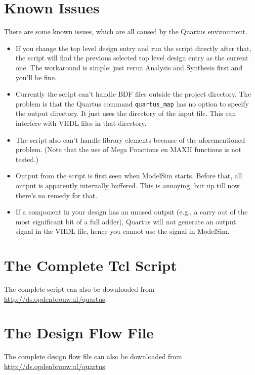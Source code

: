 \documentclass[11pt,a4paper,final,oneside,titlepage,fleqn]{article}
\begin{document}
\section{Known Issues}
\label{sec:issues}
There are some known issues, which are all caused by the Quartus
environment.
\begin{itemize}[itemsep=0pt]
\item If you change the top level design entry and run the script directly after
that, the script will find the previous selected top level design entry as
the current one. The workaround is simple: just
rerun Analysis and Synthesis first and you'll be fine.
\item Currently the script can't handle BDF files outside the project directory.
The problem is that the Quartus command \texttt{quartus\_map} has no option
to specify the output directory. It just uses the directory of the input
file. This can interfere with VHDL files in that directory.
\item The script also can't handle library elements because of the aforementioned
problem. (Note that the use of Mega Functions en MAXII functions is not
tested.)
\item Output from the script is first seen when ModelSim starts. Before that, all
output is apparently internally buffered. This is annoying, but up till now
there's no remedy for that.
\item If a component in your design has an unused output (e.g., a carry out of
the most significant bit of a full adder), Quartus will not generate an output
signal in the VHDL file, hence you cannot use the signal in ModelSim.
\end{itemize}

\newpage
\appendix
\section{The Complete Tcl Script}
\label{app:completescript}
The complete script can also be downloaded from \url{http://ds.opdenbrouw.nl/quartus}.


\newpage
\section{The Design Flow File}
\label{app:completeflowfile}
The complete design flow file can also be downloaded from \url{http://ds.opdenbrouw.nl/quartus}.

\end{document}
